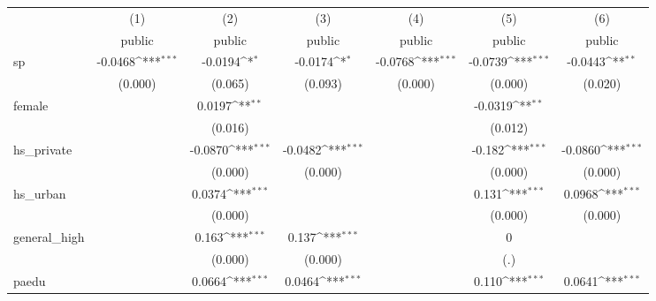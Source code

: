{
\def\sym#1{\ifmmode^{#1}\else\(^{#1}\)\fi}
\begin{tabular}{l*{6}{c}}
\hline\hline
            &\multicolumn{1}{c}{(1)}&\multicolumn{1}{c}{(2)}&\multicolumn{1}{c}{(3)}&\multicolumn{1}{c}{(4)}&\multicolumn{1}{c}{(5)}&\multicolumn{1}{c}{(6)}\\
            &\multicolumn{1}{c}{public}&\multicolumn{1}{c}{public}&\multicolumn{1}{c}{public}&\multicolumn{1}{c}{public}&\multicolumn{1}{c}{public}&\multicolumn{1}{c}{public}\\
\hline
sp          &     -0.0468\sym{***}&     -0.0194\sym{*}  &     -0.0174\sym{*}  &     -0.0768\sym{***}&     -0.0739\sym{***}&     -0.0443\sym{**} \\
            &     (0.000)         &     (0.065)         &     (0.093)         &     (0.000)         &     (0.000)         &     (0.020)         \\
[1em]
female      &                     &      0.0197\sym{**} &                     &                     &     -0.0319\sym{**} &                     \\
            &                     &     (0.016)         &                     &                     &     (0.012)         &                     \\
[1em]
hs\_private  &                     &     -0.0870\sym{***}&     -0.0482\sym{***}&                     &      -0.182\sym{***}&     -0.0860\sym{***}\\
            &                     &     (0.000)         &     (0.000)         &                     &     (0.000)         &     (0.000)         \\
[1em]
hs\_urban    &                     &      0.0374\sym{***}&                     &                     &       0.131\sym{***}&      0.0968\sym{***}\\
            &                     &     (0.000)         &                     &                     &     (0.000)         &     (0.000)         \\
[1em]
general\_high&                     &       0.163\sym{***}&       0.137\sym{***}&                     &           0         &                     \\
            &                     &     (0.000)         &     (0.000)         &                     &         (.)         &                     \\
[1em]
paedu       &                     &      0.0664\sym{***}&      0.0464\sym{***}&                     &       0.110\sym{***}&      0.0641\sym{***}\\

\end{tabular}}
